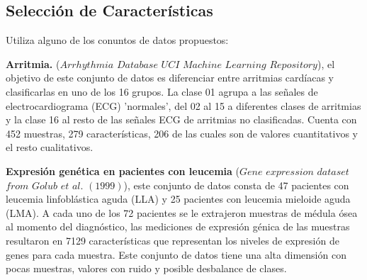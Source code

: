 \subsection{Selección de Características}

Utiliza alguno de los conuntos de datos propuestos:

\textbf{Arritmia.}  ($Arrhythmia$ $Database$ $UCI$ $Machine$ $Learning$ $Repository$), el objetivo de este conjunto de datos es
diferenciar entre arritmias cardíacas y clasificarlas en uno de los 16 grupos. La clase 01 agrupa a las señales de electrocardiograma
(ECG) 'normales', del 02 al 15 a diferentes clases de arritmias y la clase 16 al resto de las señales ECG de arritmias no clasificadas.
Cuenta con 452 muestras, 279 características, 206 de las cuales son de valores cuantitativos y el resto cualitativos.

\textbf{Expresión genética en pacientes con leucemia} ($Gene$ $expression$ $dataset$ $from$ $Golub$ $et$ $al.$ $(1999)$),
este conjunto de datos consta de 47 pacientes con leucemia linfoblástica aguda (LLA) y 25 pacientes con leucemia mieloide aguda
(LMA). A cada uno de los 72 pacientes se le extrajeron muestras de médula ósea al momento del diagnóstico, las mediciones de expresión
génica de las muestras resultaron en 7129 características que representan los niveles de expresión de genes para cada muestra. Este
conjunto de datos tiene una alta dimensión con pocas muestras, valores con ruido y posible desbalance de clases.

